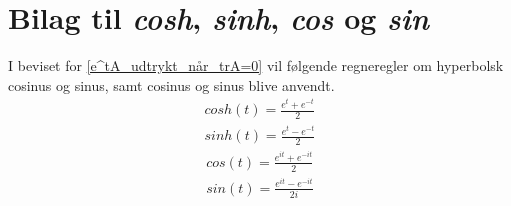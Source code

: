 \newpage
\section{Bilag til \textit{cosh}, \textit{sinh}, \textit{cos} og \textit{sin}} \label{bilag:cos_og_sin}

I beviset for \autoref{e^tA_udtrykt_når_trA=0} vil følgende regneregler om hyperbolsk cosinus og sinus, samt cosinus og sinus blive anvendt.
\begin{align} \label{eq:sinh_og_cosh}
    cosh(t) = \frac{e^t+e^{-t}}{2}\\
    sinh(t) = \frac{e^t-e^{-t}}{2}
\end{align}
\begin{align}\label{eq:sin_og_cos}
    cos(t) = \frac{e^{it}+e^{-it}}{2}\\
    sin(t)=\frac{e^{it}-e^{-it}}{2i}
\end{align}

